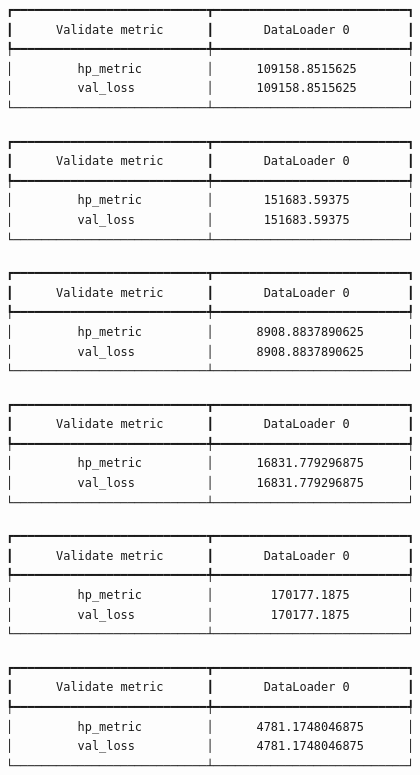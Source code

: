 \documentclass[
  letterpaper,
  DIV=11,
  numbers=noendperiod]{scrreprt}
\begin{document}
\begin{verbatim}
┏━━━━━━━━━━━━━━━━━━━━━━━━━━━┳━━━━━━━━━━━━━━━━━━━━━━━━━━━┓
┃      Validate metric      ┃       DataLoader 0        ┃
┡━━━━━━━━━━━━━━━━━━━━━━━━━━━╇━━━━━━━━━━━━━━━━━━━━━━━━━━━┩
│         hp_metric         │      109158.8515625       │
│         val_loss          │      109158.8515625       │
└───────────────────────────┴───────────────────────────┘
\end{verbatim}

\begin{verbatim}
┏━━━━━━━━━━━━━━━━━━━━━━━━━━━┳━━━━━━━━━━━━━━━━━━━━━━━━━━━┓
┃      Validate metric      ┃       DataLoader 0        ┃
┡━━━━━━━━━━━━━━━━━━━━━━━━━━━╇━━━━━━━━━━━━━━━━━━━━━━━━━━━┩
│         hp_metric         │       151683.59375        │
│         val_loss          │       151683.59375        │
└───────────────────────────┴───────────────────────────┘
\end{verbatim}

\begin{verbatim}
┏━━━━━━━━━━━━━━━━━━━━━━━━━━━┳━━━━━━━━━━━━━━━━━━━━━━━━━━━┓
┃      Validate metric      ┃       DataLoader 0        ┃
┡━━━━━━━━━━━━━━━━━━━━━━━━━━━╇━━━━━━━━━━━━━━━━━━━━━━━━━━━┩
│         hp_metric         │      8908.8837890625      │
│         val_loss          │      8908.8837890625      │
└───────────────────────────┴───────────────────────────┘
\end{verbatim}

\begin{verbatim}
┏━━━━━━━━━━━━━━━━━━━━━━━━━━━┳━━━━━━━━━━━━━━━━━━━━━━━━━━━┓
┃      Validate metric      ┃       DataLoader 0        ┃
┡━━━━━━━━━━━━━━━━━━━━━━━━━━━╇━━━━━━━━━━━━━━━━━━━━━━━━━━━┩
│         hp_metric         │      16831.779296875      │
│         val_loss          │      16831.779296875      │
└───────────────────────────┴───────────────────────────┘
\end{verbatim}

\begin{verbatim}
┏━━━━━━━━━━━━━━━━━━━━━━━━━━━┳━━━━━━━━━━━━━━━━━━━━━━━━━━━┓
┃      Validate metric      ┃       DataLoader 0        ┃
┡━━━━━━━━━━━━━━━━━━━━━━━━━━━╇━━━━━━━━━━━━━━━━━━━━━━━━━━━┩
│         hp_metric         │        170177.1875        │
│         val_loss          │        170177.1875        │
└───────────────────────────┴───────────────────────────┘
\end{verbatim}

\begin{verbatim}
┏━━━━━━━━━━━━━━━━━━━━━━━━━━━┳━━━━━━━━━━━━━━━━━━━━━━━━━━━┓
┃      Validate metric      ┃       DataLoader 0        ┃
┡━━━━━━━━━━━━━━━━━━━━━━━━━━━╇━━━━━━━━━━━━━━━━━━━━━━━━━━━┩
│         hp_metric         │      4781.1748046875      │
│         val_loss          │      4781.1748046875      │
└───────────────────────────┴───────────────────────────┘
\end{verbatim}
\end{document}
